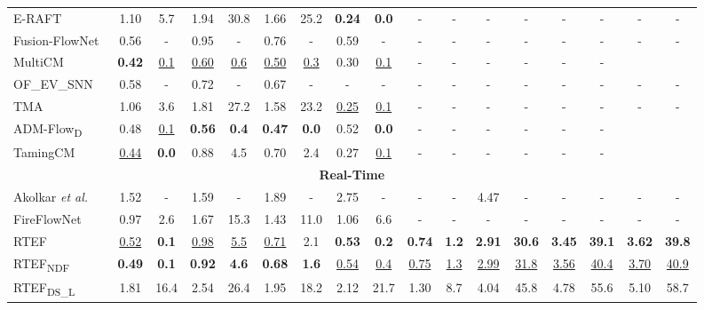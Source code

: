 \begin{table}[ht]
{\begin{tabular}{@{}l cc cc cc cc cc cc cc cc@{}}
      E-RAFT~\cite{Gehrig2021DenseOF} & 1.10 & 5.7 & 1.94 & 30.8 & 1.66 & 25.2 & \textbf{0.24} & \textbf{0.0} & - & - & - & - & - & - & - & - \\
      Fusion-FlowNet~\cite{Lee2021FusionFlowNetEO} & 0.56 & - & 0.95 & - & 0.76 & - & 0.59 & - & - & - & - & - & - & - & - & - \\
      MultiCM~\cite{Shiba2022SecretsOE} & \textbf{0.42} & \underline{0.1} & \underline{0.60} & \underline{0.6} & \underline{0.50} & \underline{0.3} & 0.30 & \underline{0.1} & - & - & - & - & - & - \\
      OF\_EV\_SNN~\cite{Cuadrado2023OpticalFE} & 0.58 & - & 0.72 & - & 0.67 & - & - & - & - & - & - & - & - & - & - & - \\
      TMA~\cite{Liu2023TMATM} & 1.06 & 3.6 & 1.81 & 27.2 & 1.58 & 23.2 & \underline{0.25} & \underline{0.1} & - & - & - & - & - & - & - & - \\
      ADM-Flow\textsubscript{D}~\cite{Luo2023LearningOF} & 0.48 & \underline{0.1} & \textbf{0.56} & \textbf{0.4} & \textbf{0.47} & \textbf{0.0} & 0.52 & \textbf{0.0} & - & - & - & - & - & - \\
      TamingCM~\cite{ParedesValls2023TamingCM} & \underline{0.44} & \textbf{0.0} & 0.88 & 4.5 & 0.70 & 2.4 & 0.27 & \underline{0.1} & - & - & - & - & - & - \\
      \midrule
      \midrule
      \multicolumn{17}{c}{\textbf{Real-Time}} \\
      Akolkar \textit{et al.}~\cite{Akolkar2020SeeBY} & 1.52 & - & 1.59 & - & 1.89 & - & 2.75 & - & - & - & 4.47 & - & - & - & - & - \\
      FireFlowNet~\cite{ParedesValls2021BackTE} & 0.97 & 2.6 & 1.67 & 15.3 & 1.43 & 11.0 & 1.06 & 6.6 & - & - & - & - & - & - & - & - \\
      RTEF & \underline{0.52} & \textbf{0.1} & \underline{0.98} & \underline{5.5} & \underline{0.71} & 2.1 & \textbf{0.53} & \textbf{0.2} & \textbf{0.74} & \textbf{1.2} & \textbf{2.91} & \textbf{30.6} & \textbf{3.45} & \textbf{39.1} & \textbf{3.62} & \textbf{39.8} \\
      RTEF\textsubscript{NDF} & \textbf{0.49} & \textbf{0.1} & \textbf{0.92} & \textbf{4.6} & \textbf{0.68} & \textbf{1.6} & \underline{0.54} & \underline{0.4} & \underline{0.75} & \underline{1.3} & \underline{2.99} & \underline{31.8} & \underline{3.56} & \underline{40.4} & \underline{3.70} & \underline{40.9} \\
      RTEF\textsubscript{DS\_L} & 1.81 & 16.4 & 2.54 & 26.4 & 1.95 & 18.2 & 2.12 & 21.7 & 1.30 & 8.7 & 4.04 & 45.8 & 4.78 & 55.6 & 5.10 & 58.7 \\

\end{tabular}}
\end{table}
